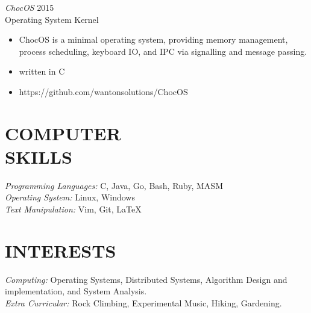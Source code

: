 \documentclass[line,margin]{res}
\begin{document}
\begin{resume}
{\sl ChocOS} \hfill 2015\\
	Operating System Kernel
\begin{itemize} \itemsep -2pt
		\item ChocOS is a minimal operating system, providing memory management, process scheduling, keyboard IO, and IPC via signalling and message passing.
		\item written in C
		\item https://github.com/wantonsolutions/ChocOS
\end{itemize}




\section{COMPUTER \\ SKILLS} 
	{\sl Programming Languages:} C, Java, Go, Bash, Ruby, MASM\\
	{\sl Operating System:} Linux, Windows\\
	{\sl Text Manipulation:} Vim, Git, \LaTeX \\

\section{INTERESTS}
	{\sl Computing:} Operating Systems, Distributed Systems, Algorithm Design and implementation, and System Analysis.\\
	{\sl Extra Curricular:} Rock Climbing, Experimental Music, Hiking, Gardening.\\

\end{resume}
\end{document}
